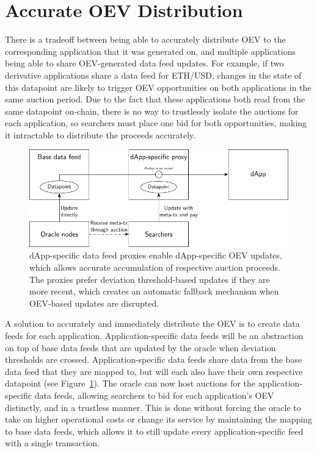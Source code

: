\documentclass[11pt]{article}
\begin{document}
\section{Accurate OEV Distribution}

There is a tradeoff between being able to accurately distribute OEV to the corresponding application that it was generated on, and multiple applications being able to share OEV-generated data feed updates.
For example, if two derivative applications share a data feed for ETH/USD, changes in the state of this datapoint are likely to trigger OEV opportunities on both applications in the same auction period.
Due to the fact that these applications both read from the same datapoint on-chain, there is no way to trustlessly isolate the auctions for each application, so searchers must place one bid for both opportunities, making it intractable to distribute the proceeds accurately.

\begin{figure}
	\centering
	\includegraphics{fig/oev-distribution/oev-distribution}
	\caption{dApp-specific data feed proxies enable dApp-specific OEV updates, which allows accurate accumulation of respective auction proceeds.
		The proxies prefer deviation threshold-based updates if they are more recent, which creates an automatic fallback mechanism when OEV-based updates are disrupted.}
	\label{fig:oev-distribution}
\end{figure}

A solution to accurately and immediately distribute the OEV is to create data feeds for each application.
Application-specific data feeds will be an abstraction on top of base data feeds that are updated by the oracle when deviation thresholds are crossed.
Application-specific data feeds share data from the base data feed that they are mapped to, but will each also have their own respective datapoint (see Figure~\ref{fig:oev-distribution}).
The oracle can now host auctions for the application-specific data feeds, allowing searchers to bid for each application's OEV distinctly, and in a trustless manner.
This is done without forcing the oracle to take on higher operational costs or change its service by maintaining the mapping to base data feeds, which allows it to still update every application-specific feed with a single transaction.
\end{document}
